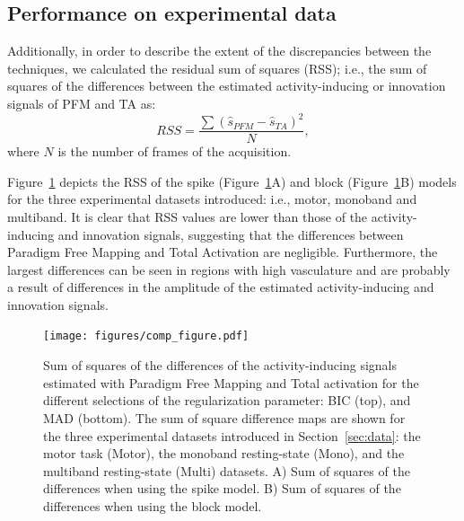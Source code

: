 \subsection{Performance on experimental data}

Additionally, in order to describe the extent of the discrepancies between the techniques, we calculated the residual sum of squares (RSS); i.e., the sum of squares of the differences between the estimated activity-inducing or innovation signals of PFM and TA as:
\begin{equation}
    RSS = \frac{\sum{(\hat{s}_{PFM} - \hat{s}_{TA})^2}}{N},
\end{equation}
where \(N\) is the number of frames of the acquisition.

Figure~\ref{fig:rss} depicts the RSS of the spike (Figure~\ref{fig:rss}A) and block (Figure~\ref{fig:rss}B) models for the three experimental datasets introduced: i.e., motor, monoband and multiband. It is clear that RSS values are lower than those of the activity-inducing and innovation signals, suggesting that the differences between Paradigm Free Mapping and Total Activation are negligible. Furthermore, the largest differences can be seen in regions with high vasculature and are probably a result of differences in the amplitude of the estimated activity-inducing and innovation signals.

\begin{figure}[t!]
    \begin{center}
        \texttt{[image: figures/comp\_figure.pdf]}
    \end{center}
    \caption{Sum of squares of the differences of the activity-inducing signals estimated with Paradigm Free Mapping and Total activation for the different selections of the regularization parameter: BIC (top), and MAD (bottom). The sum of square difference maps are shown for the three experimental datasets introduced in Section~\ref{sec:data}: the motor task (Motor), the monoband resting-state (Mono), and the multiband resting-state (Multi) datasets. A) Sum of squares of the differences when using the spike model. B) Sum of squares of the differences when using the block model.}
\label{fig:rss}
\end{figure}

